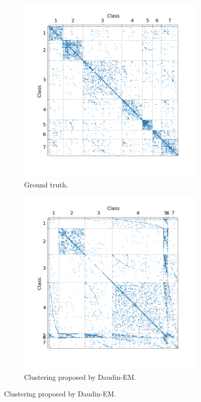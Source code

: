 \documentclass[switch, 12pt]{article}
\begin{document}
\begin{figure}[H]
    \centering
    \hfill
    \begin{subfigure}{0.45\linewidth}
        \centering
        \includegraphics[width=\linewidth, trim={45 35 35 40}, clip]{figures/cora_gt.png}
        \caption{Ground truth.}
        \label{fig:cora_gt}
    \end{subfigure}
    \hfill
    \begin{subfigure}{0.45\linewidth}
        \centering
        \includegraphics[width=\linewidth, trim={45 35 35 40}, clip]{figures/cora_SBM.png}
        \caption{Clustering proposed by Daudin-EM.}
        \label{fig:cora_SBM}
    \end{subfigure}
    \hfill


\end{figure}
\end{document}
